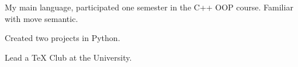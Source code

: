 
My main language, participated one semester in the C++ OOP course. Familiar with move semantic.

\divider

Created two projects in Python.

\divider


\divider

Lead a TeX Club at the University.




